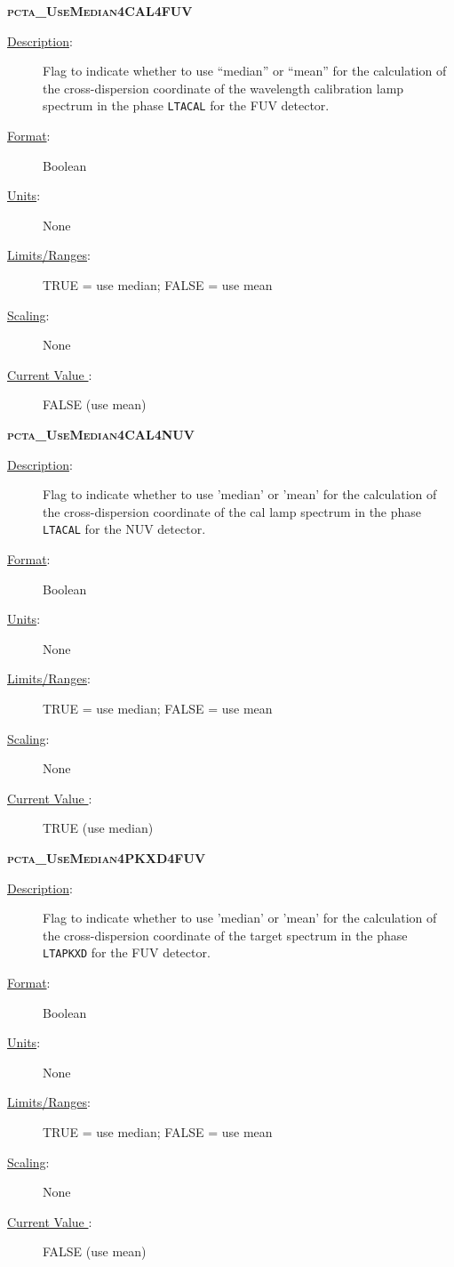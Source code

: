 \item{\textsc{\bf pcta\_UseMedian4CAL4FUV}}
	\begin{description}
	\item[\underline{\rm Description}:]Flag to indicate whether to use ``median'' or ``mean'' for the calculation of the cross-dispersion coordinate of the wavelength calibration lamp spectrum in the phase \texttt{LTACAL} for the FUV detector.
	\item[\underline{\rm Format}:]    Boolean
	\item[\underline{\rm Units}:]     None
	\item[\underline{\rm Limits/Ranges}:]  TRUE = use median;  FALSE = use mean
	\item[\underline{\rm Scaling}:]   None
	\item[\underline{\rm Current Value }:]   FALSE (use mean)
\end{description}

\item{\textsc{\bf pcta\_UseMedian4CAL4NUV}}
	\begin{description}
	\item[\underline{\rm Description}:]Flag to indicate whether to use 'median' or 'mean' for the calculation of the cross-dispersion coordinate of the cal lamp spectrum in the phase \texttt{LTACAL} for the NUV detector.
	\item[\underline{\rm Format}:]    Boolean
	\item[\underline{\rm Units}:]     None
	\item[\underline{\rm Limits/Ranges}:]  TRUE = use median;  FALSE = use mean
	\item[\underline{\rm Scaling}:]   None
	\item[\underline{\rm Current Value }:]   TRUE (use median)
\end{description}

\item{\textsc{\bf pcta\_UseMedian4PKXD4FUV}}
	\begin{description}
	\item[\underline{\rm Description}:]Flag to indicate whether to use 'median' or 'mean' for the calculation of the cross-dispersion coordinate of the target spectrum in the phase \texttt{LTAPKXD} for the FUV detector.
	\item[\underline{\rm Format}:]    Boolean
	\item[\underline{\rm Units}:]     None
	\item[\underline{\rm Limits/Ranges}:]  TRUE = use median;  FALSE = use mean
	\item[\underline{\rm Scaling}:]   None
	\item[\underline{\rm Current Value }:]   FALSE (use mean)
\end{description}

